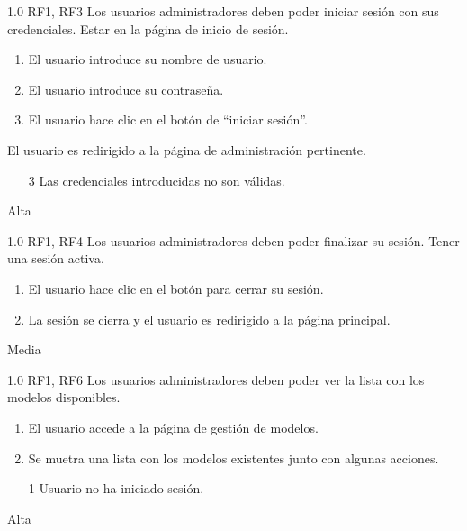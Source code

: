{1.0}
{RF1, RF3}
{Los usuarios administradores deben poder iniciar sesión con sus credenciales.}
{Estar en la página de inicio de sesión.}
{
    \begin{enumerate}
        \def\labelenumi{\arabic{enumi}.}
        \tightlist
        \item El usuario introduce su nombre de usuario.
        \item El usuario introduce su contraseña.
        \item El usuario hace clic en el botón de ``iniciar sesión''.
    \end{enumerate}
}
{El usuario es redirigido a la página de administración pertinente.}
{
    \begin{itemize}
        \item [3] Las credenciales introducidas no son válidas.
    \end{itemize}
}
{Alta}

{1.0}
{RF1, RF4}
{Los usuarios administradores deben poder finalizar su sesión.}
{Tener una sesión activa.}
{
    \begin{enumerate}
        \def\labelenumi{\arabic{enumi}.}
        \tightlist
        \item El usuario hace clic en el botón para cerrar su sesión.
        \item La sesión se cierra y el usuario es redirigido a la página principal.
    \end{enumerate}
}
{}
{}
{Media}

{1.0}
{RF1, RF6}
{Los usuarios administradores deben poder ver la lista con los modelos disponibles.}
{}
{
    \begin{enumerate}
        \def\labelenumi{\arabic{enumi}.}
        \tightlist
        \item El usuario accede a la página de gestión de modelos.
        \item Se muetra una lista con los modelos existentes junto con algunas acciones.
    \end{enumerate}
}
{}
{
    \begin{itemize}
        \item [1] Usuario no ha iniciado sesión.
    \end{itemize}
}
{Alta}

